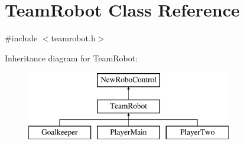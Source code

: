 \hypertarget{classTeamRobot}{
\section{TeamRobot Class Reference}
\label{classTeamRobot}
}


{\ttfamily \#include $<$teamrobot.h$>$}

Inheritance diagram for TeamRobot:\begin{figure}[H]
\begin{center}
\leavevmode
\includegraphics[height=3cm]{classTeamRobot}
\end{center}
\end{figure}
